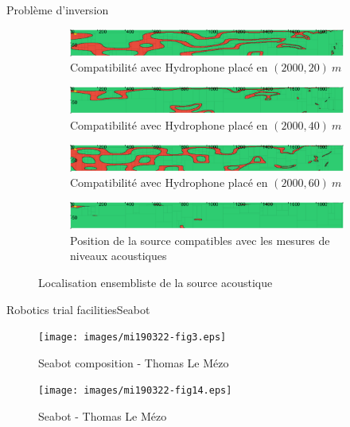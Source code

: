 \documentclass[9pt, xcolor={usenames, dvipsnames}]{beamer}
\begin{document}
				\begin{frame}{Problème d'inversion}
					\begin{figure}[!htb]
						\begin{subfigure}[!htb]{\textwidth}
							\includegraphics[width=\textwidth]{images/Hydrophone_20_2000.png}
							\caption{Compatibilité avec Hydrophone placé en $(2000, 20)\ m$}
						\end{subfigure}
						\begin{subfigure}[!htb]{\textwidth}
							\includegraphics[width=\textwidth]{images/Hydrophone_40_2000.png}
							\caption{Compatibilité avec Hydrophone placé en $(2000, 40)\ m$}
						\end{subfigure}
						\begin{subfigure}[!htb]{\textwidth}
							\includegraphics[width=\textwidth]{images/Hydrophone_60_2000.png}
							\caption{Compatibilité avec Hydrophone placé en $(2000, 60)\ m$}
						\end{subfigure}
						\begin{subfigure}[!htb]{\textwidth}
							\includegraphics[width=\textwidth]{images/Proteus.png}
							\caption{Position de la source compatibles avec les mesures de niveaux acoustiques}
						\end{subfigure}
						\caption{Localisation ensembliste de la source acoustique}
					\end{figure}
				\end{frame}

			\begin{frame}{Robotics trial facilities}{Seabot~}
				\centering
				\begin{minipage}{0.45\textwidth}
					\begin{figure}
						\texttt{[image: images/mi190322-fig3.eps]}
						\caption{Seabot composition - Thomas Le Mézo}
					\end{figure}
				\end{minipage}
				\hspace{1cm}
				\begin{minipage}{0.3\textwidth}
					\begin{figure}
						\texttt{[image: images/mi190322-fig14.eps]}
						\caption{Seabot - Thomas Le Mézo}
					\end{figure}
				\end{minipage}
			\end{frame}
\end{document}
